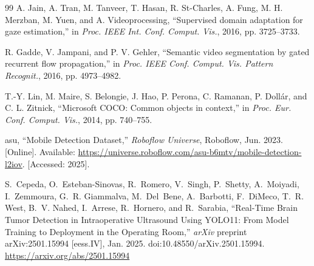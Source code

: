 \documentclass[conference]{IEEEtran}
\begin{document}
\begin{thebibliography}{99}
 A. Jain, A. Tran, M. Tanveer, T. Hasan, R. St-Charles, A. Fung, M. H. Merzban, M. Yuen, and A. Videoprocessing, ``Supervised domain adaptation for gaze estimation,'' in \textit{Proc. IEEE Int. Conf. Comput. Vis.}, 2016, pp. 3725--3733.

 R. Gadde, V. Jampani, and P. V. Gehler, ``Semantic video segmentation by gated recurrent flow propagation,'' in \textit{Proc. IEEE Conf. Comput. Vis. Pattern Recognit.}, 2016, pp. 4973--4982.

 T.-Y. Lin, M. Maire, S. Belongie, J. Hao, P. Perona, C. Ramanan, P. Dollár, and C. L. Zitnick, ``Microsoft COCO: Common objects in context,'' in \textit{Proc. Eur. Conf. Comput. Vis.}, 2014, pp. 740--755.

 asu, ``Mobile Detection Dataset,'' \textit{Roboflow Universe}, Roboflow, Jun. 2023. [Online]. Available: \url{https://universe.roboflow.com/asu-b6mtv/mobile-detection-l2iov}. [Accessed: 2025].

S.~Cepeda, O.~Esteban-Sinovas, R.~Romero, V.~Singh, P.~Shetty, A.~Moiyadi,
I.~Zemmoura, G.~R. Giammalva, M.~Del~Bene, A.~Barbotti, F.~DiMeco,
T.~R. West, B.~V. Nahed, I.~Arrese, R.~Hornero, and R.~Sarabia,
``Real-Time Brain Tumor Detection in Intraoperative Ultrasound Using YOLO11:
From Model Training to Deployment in the Operating Room,''
\emph{arXiv} preprint arXiv:2501.15994 [eess.IV], Jan. 2025.
doi:10.48550/arXiv.2501.15994. \url{https://arxiv.org/abs/2501.15994}



\end{thebibliography}
\end{document}
